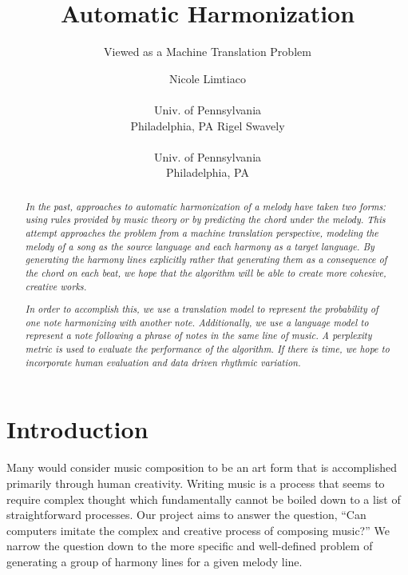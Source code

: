 \documentclass{sig-alternate}
\begin{document}
 

\title{Automatic Harmonization}
\subtitle{Viewed as a Machine Translation Problem}
\author{
\alignauthor Nicole Limtiaco \\  \\ Univ. of Pennsylvania \\ Philadelphia, PA
\alignauthor Rigel Swavely \\  \\ Univ. of Pennsylvania \\ Philadelphia, PA}
\date{}
\maketitle

\begin{abstract}
  \textit{In the past, approaches to automatic harmonization of a melody
  have taken two forms: using rules provided by music theory or by predicting
  the chord under the melody. This attempt approaches the problem from a machine translation perspective, 
  modeling the melody of a song as the source language and each harmony as a target language.
  By generating the harmony lines explicitly rather that generating them as a
  consequence of the chord on each beat, we hope that the algorithm will be able to create
  more cohesive, creative works.}

  \textit{In order to accomplish this, we use a translation model to represent the probability
  of one note harmonizing with another note. Additionally, we use a language model to represent
  a note following a phrase of notes in the same line of music. A perplexity metric is used to 
  evaluate the performance of the algorithm. If there is time, we hope to incorporate human evaluation
  and data driven rhythmic variation.}
\end{abstract}

\section{Introduction}
\label{sec:intro}
Many would consider music composition to be an art form that is accomplished
primarily through human creativity. Writing music is a process that seems to require
complex thought which fundamentally cannot be boiled down to a list of straightforward
processes. Our project aims to answer the question, ``Can computers imitate the complex
and creative process of composing music?'' We narrow the question down to the more specific
and well-defined problem of generating a group of harmony lines for a given melody line.
\end{document}
